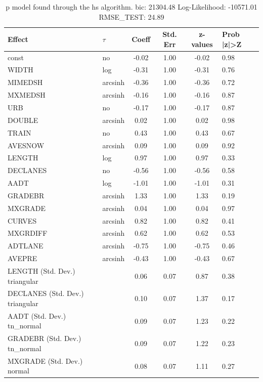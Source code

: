 \begin{table}
	\caption{p model found through the hs algorithm. bic: 21304.48 Log-Likelihood: -10571.01 RMSE_TEST: 24.89}
	\begin{center}
		\begin{tabular}{|l|l|c|c|c|l|}
			\hline
			Effect & $\tau$ & Coeff & Std. Err & z-values & Prob |z|>Z \\
			\hline
			const & no & -0.02 & 1.00 & -0.02 & 0.98 \\
			\hline
			WIDTH & log & -0.31 & 1.00 & -0.31 & 0.76 \\
			\hline
			MIMEDSH & arcsinh & -0.36 & 1.00 & -0.36 & 0.72 \\
			\hline
			MXMEDSH & arcsinh & -0.16 & 1.00 & -0.16 & 0.87 \\
			\hline
			URB & no & -0.17 & 1.00 & -0.17 & 0.87 \\
			\hline
			DOUBLE & arcsinh & 0.02 & 1.00 & 0.02 & 0.98 \\
			\hline
			TRAIN & no & 0.43 & 1.00 & 0.43 & 0.67 \\
			\hline
			AVESNOW & arcsinh & 0.09 & 1.00 & 0.09 & 0.92 \\
			\hline
			LENGTH & log & 0.97 & 1.00 & 0.97 & 0.33 \\
			\hline
			DECLANES & no & -0.56 & 1.00 & -0.56 & 0.58 \\
			\hline
			AADT & log & -1.01 & 1.00 & -1.01 & 0.31 \\
			\hline
			GRADEBR & arcsinh & 1.33 & 1.00 & 1.33 & 0.19 \\
			\hline
			MXGRADE & arcsinh & 0.04 & 1.00 & 0.04 & 0.97 \\
			\hline
			CURVES & arcsinh & 0.82 & 1.00 & 0.82 & 0.41 \\
			\hline
			MXGRDIFF & arcsinh & 0.62 & 1.00 & 0.62 & 0.53 \\
			\hline
			ADTLANE & arcsinh & -0.75 & 1.00 & -0.75 & 0.46 \\
			\hline
			AVEPRE & arcsinh & -0.43 & 1.00 & -0.43 & 0.67 \\
			\hline
			LENGTH (Std. Dev.) triangular &  & 0.06 & 0.07 & 0.87 & 0.38 \\
			\hline
			DECLANES (Std. Dev.) triangular &  & 0.10 & 0.07 & 1.37 & 0.17 \\
			\hline
			AADT (Std. Dev.) tn_normal &  & 0.09 & 0.07 & 1.23 & 0.22 \\
			\hline
			GRADEBR (Std. Dev.) tn_normal &  & 0.09 & 0.07 & 1.22 & 0.23 \\
			\hline
			MXGRADE (Std. Dev.) normal &  & 0.08 & 0.07 & 1.11 & 0.27 \\

\end{tabular}
\end{center}
\end{table}
